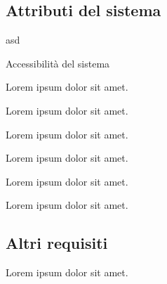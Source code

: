 \documentclass{scrreprt}
\begin{document}
	\subsection{Attributi del sistema}
	\begin{labeling}{asd}
	\item
	\begin{labeling}{Accessibilità del sistema}
		
		\item [Affidabilità]
			Lorem ipsum dolor sit amet.
		
		\item [Accessibilità del sistema]
			Lorem ipsum dolor sit amet.
		
		\item [Sicurezza]
			Lorem ipsum dolor sit amet.
		
		\item [Mantenibilità]
			Lorem ipsum dolor sit amet.
		
		\item [Scalabilità]
			Lorem ipsum dolor sit amet.
		
		\item [Portabilità]
			Lorem ipsum dolor sit amet.
	\end{labeling}
	\end{labeling}


	\subsection{Altri requisiti}
	Lorem ipsum dolor sit amet.
\end{document}

